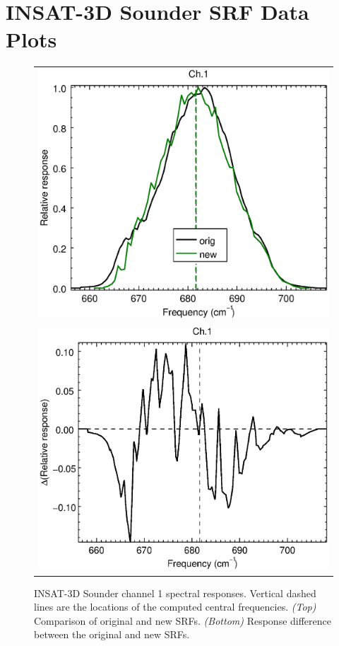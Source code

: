 \section{INSAT-3D Sounder SRF Data Plots}
\label{app.sndr_srf_data_plots}

\begin{figure}[H]
  \centering
  \begin{tabular}{c}
    \includegraphics[scale=0.55]{graphics/sndr/srf/sndr_insat3d-1.eps} \\
    \includegraphics[scale=0.55]{graphics/sndr/srf/sndr_insat3d-1.difference.eps}
  \end{tabular}
  \caption{INSAT-3D Sounder channel 1 spectral responses. Vertical dashed lines are the locations of the computed central frequencies. \emph{(Top)} Comparison of original and new SRFs. \emph{(Bottom)} Response difference between the original and new SRFs.}
  \label{fig:sndr_ch1}
\end{figure}


